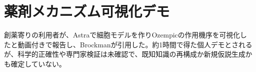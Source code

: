 \section{薬剤メカニズム可視化デモ}
創薬寄りの利用者が、Astraで細胞モデルを作りOzempicの作用機序を可視化したと動画付きで報告し、Brockmanが引用した。約1時間で得た個人デモとされるが、科学的正確性や専門家検証は未確認で、既知知識の再構成か新規仮説生成かも確定していない。
